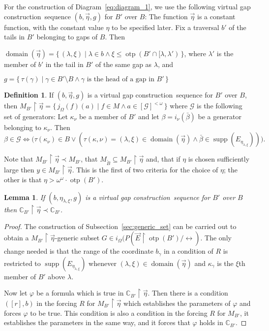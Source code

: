\documentclass[
twoside,
]{article}
\newenvironment{myinparaenum}{\begin{inparaenum}[\upshape(i)]
}{\end{inparaenum}}
\newtheorem{lemma}[theorem]{Lemma}
\theoremstyle{definition}
\newtheorem{definition}[theorem]{Definition}
\theoremstyle{remark}
\newcommand{\vg}{virtual gap construction}
\newcommand{\etarestrict}{\restrict}
\newcommand{\xre}{\etarestrict\vec\eta{}}
\DeclareMathOperator{\supp}{supp}   %
\DeclareMathOperator{\otp}{otp}
\newcommand{\ords}{\Omega}
\newcommand\gkeq{\leftrightarrow}
\newcommand\mgkeq{/{\gkeq}}
\renewcommand{\phi}{\varphi}
\newcommand{\set}[1]{\{\,#1\,\}}
\newcommand{\restrict}{{\upharpoonright}}
\DeclareMathOperator{\domain}{domain}
\newcommand\chang{\mathbb{C}}
\begin{document}
For the construction of Diagram~\eqref{eq:diagram_1},  we use the following \vg\ sequence
$(b,\vec\eta,g)$ for $B'$ over $B$:   The function $\vec\eta$ is 
a constant function, with the constant value $\eta$ to be specified
later.  Fix a traversal $b'$ of the tails in $B'$ belonging to  gaps of
$B$.  Then
\begin{myinparaenum}
\item $\domain(\vec\eta)=\set{(\lambda,\xi)\mid \lambda\in b\land
    \xi\leq\otp(B'\cap[\lambda,\lambda')}$, where $\lambda'$ is
  the member of $b'$ in the tail in $B'$ of the same gap as
  $\lambda$, and 
\item $g=\set{\tau(\gamma)\mid \gamma\in B'\setminus B\land \gamma
    \text{ is the head of a gap in }B'}$
\end{myinparaenum}

\begin{definition}
  \label{def:Bprime_vg}
  If $(b,\vec\eta,g)$ is a \vg\ sequence for $B'$ over $B$, then
  $M_{B'}\xre=\set{j_{\ords}(f)(a)\mid f\in M\land a\in
    [\mathcal{G}]^{<\omega}}$ where $\mathcal{G}$ is the following set
  of generators:  Let $\kappa_\nu$ be a member of $B'$ and let $\beta=i_{\nu}(\bar\beta)$
  be a generator belonging to $\kappa_{\nu}$.      Then
  \begin{equation*}
    \beta\in\mathcal{G} \iff \bigl(
    \tau(\kappa_\nu)\in B  \lor
    (\tau(\kappa,\nu)=(\lambda,\xi)\in\domain(\vec\eta)\land \bar\beta\in\supp(E_{\eta_{\lambda,\xi}}))\bigr).
  \end{equation*}
\end{definition} 


Note that $M_{B'}\xre\prec M_{B'}$,  that $M_{\tilde B}\subseteq
M_{B'}\xre$ and, that if $\eta$ is chosen sufficiently large then $y\in
M_{B'}\xre$.    This is the first of two criteria for the choice of
$\eta$; the other is that $\eta>\omega^{\omega}\cdot \otp(B')$.

\begin{lemma}
  \label{thm:M-B-eta-elem}
  If $(b,\eta_{\lambda,\xi},g)$ is a \vg\ sequence for $B'$ over $B$
  then $\chang_{B'}\xre\prec\chang_{B'}$. 
\end{lemma}

\begin{proof}
  The construction of Subsection~\ref{sec:generic_set} can
  be carried out to obtain a $M_{B'}\xre$-generic subset $G\in
  i_{\ords}(P(\vec E\restrict\otp(B')\mgkeq)$.  The only change needed is
  that the range of the coordinate $b_{\gamma}$ in a condition of $R$ is restricted
  to $\supp(E_{\eta_{\lambda,\xi}})$ whenever
  $(\lambda,\xi)\in\domain(\vec\eta)$ and $\kappa_\gamma$ is the
  $\xi$th member of $B'$ above $\lambda$.

  Now let  $\phi$ be a formula which is true in $\chang_{B'}\xre$. 
  Then there is a condition $([r],b)$ in the forcing $R$ for $M_{B'}\xre$
  which establishes the parameters of $\phi$ and forces $\phi$ to be
  true.   This condition is also a condition in the forcing $R$ for
  $M_{B'}$, it
  establishes the parameters in the same way, and it forces that $\phi$
  holds in $\chang_{B'}$.
\end{proof}
\end{document}
